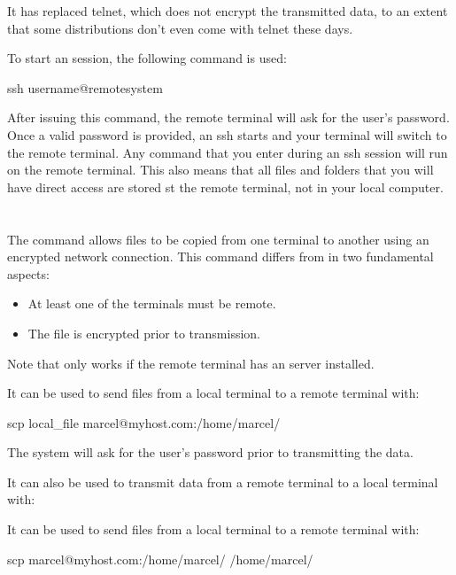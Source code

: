 It has replaced telnet, which does not encrypt the transmitted data, to an extent that some distributions don’t even come with telnet these days.

To start an  session, the following command is used:

\begin{command_line}[make]
ssh username@remotesystem
\end{command_line}

After issuing this command, the remote terminal will ask for the user’s password. Once a valid password is provided, an ssh starts and your terminal will switch to the remote terminal. Any command that you enter during an ssh session will run on the remote terminal. This  also means that all files and folders that you will have direct access are stored st the remote terminal, not in your local computer.


\section{}

The  command allows files to be copied from one terminal to another using an encrypted network connection. This command differs from  in two fundamental aspects:
\begin{itemize} 
\item At least one of the terminals must be remote.
\item The file is encrypted prior to transmission. 
\end{itemize}
Note that  only works if the remote terminal has an  server installed.

It can be used to send files from a local terminal to a remote terminal with:
\begin{command_line}[make]
scp local_file marcel@myhost.com:/home/marcel/
\end{command_line}

The system will ask for the user's password prior to transmitting the data.

It can also be used to transmit data from a remote terminal to a local terminal with:

It can be used to send files from a local terminal to a remote terminal with:
\begin{command_line}[make]
scp marcel@myhost.com:/home/marcel/ /home/marcel/
\end{command_line}

